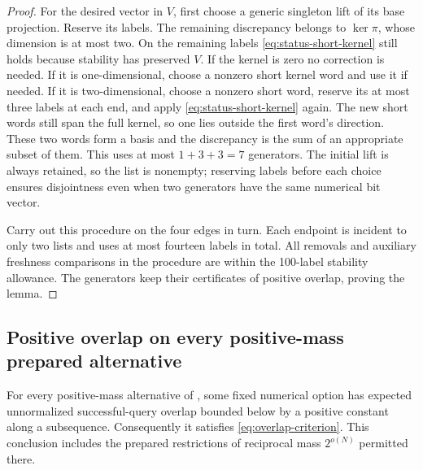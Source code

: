 \begin{proof}
For the desired vector in $V$, first choose a generic singleton lift
of its base projection. Reserve its labels. The remaining discrepancy
belongs to $\ker\pi$, whose dimension is at most two. On the remaining
labels \eqref{eq:status-short-kernel} still holds because stability has
preserved $V$. If the kernel is zero no correction is needed. If it is
one-dimensional, choose a nonzero short kernel word and use it if
needed. If it is two-dimensional, choose a nonzero short word, reserve
its at most three labels at each end, and apply
\eqref{eq:status-short-kernel} again. The new short words still span
the full kernel, so one lies outside the first word's direction.
These two words form a basis and the discrepancy is the sum of an
appropriate subset of them. This uses at most
$1+3+3=7$ generators. The initial lift is always retained, so the list
is nonempty; reserving labels before each choice ensures disjointness
even when two generators have the same numerical bit vector.

Carry out this procedure on the four edges in turn. Each endpoint is
incident to only two lists and uses at most fourteen labels in total.
All removals and auxiliary freshness comparisons in the procedure are
within the 100-label stability allowance. The generators keep their
certificates of positive overlap, proving the lemma.
\end{proof}

\subsection{Positive overlap on every positive-mass prepared alternative}

\begin{proposition}
\label{prop:positive-overlap}
For every positive-mass alternative of
, some fixed numerical option has expected
unnormalized successful-query overlap bounded below by a positive
constant along a subsequence. Consequently it satisfies
\eqref{eq:overlap-criterion}. This conclusion includes the prepared
restrictions of reciprocal mass $2^{o(N)}$ permitted there.
\end{proposition}

